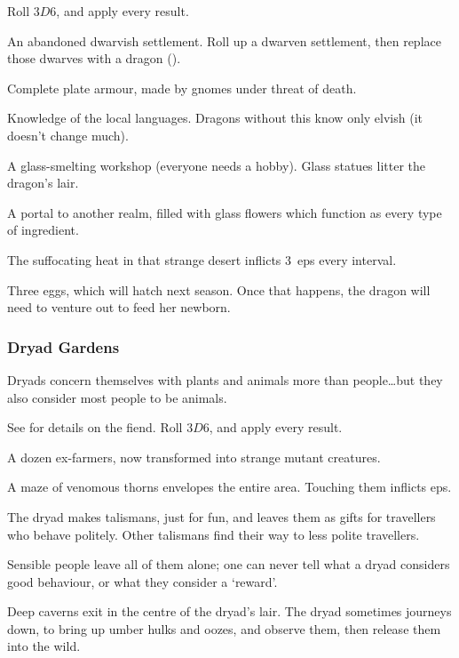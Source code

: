 \begin{multicols}{2}
Roll $3D6$, and apply every result.

\begin{dlist}
  \item
  An abandoned dwarvish settlement.
  Roll up a dwarven settlement, then replace those dwarves with a dragon ().
  \item
  Complete plate armour, made by gnomes under threat of death.
  \iftoggle{core}{(See the core rules, \autopageref{bandingArmour}.)}{}
  \item
  Knowledge of the local languages.
  Dragons without this know only elvish (it doesn't change much).
  \item
  A glass-smelting workshop (everyone needs a hobby).
  Glass statues litter the dragon's lair.
  \item
  A portal to another realm, filled with glass flowers which function as every type of \gls{ingredient}.

  The suffocating heat in that strange desert inflicts 3~\glspl{ep} every \gls{interval}.
  \item
  Three eggs, which will hatch next season.
  Once that happens, the dragon will need to venture out to feed her newborn.
\end{dlist}

\subsubsection{Dryad Gardens}
\label{dryadPoint}

Dryads concern themselves with plants and animals more than people\ldots but they also consider most people to be animals.

See  for details on the fiend.
Roll $3D6$, and apply every result.

\begin{dlist}
  \item
  A dozen ex-farmers, now transformed into strange mutant creatures.
  \item
  A maze of venomous thorns envelopes the entire area.
  Touching them inflicts \glspl{ep}.
  \item
  The dryad makes \glspl{talisman}, just for fun, and leaves them as gifts for travellers who behave politely.
  Other \glspl{talisman} find their way to less polite travellers.

  Sensible people leave all of them alone; one can never tell what a dryad considers good behaviour, or what they consider a `reward'.
  \item
  Deep caverns exit in the centre of the dryad's lair.
  The dryad sometimes journeys down, to bring up umber hulks and oozes, and observe them, then release them into the wild.


\end{dlist}
\end{multicols}
